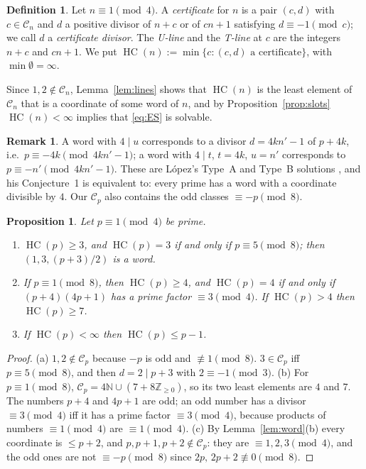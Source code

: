 \documentclass[11pt,reqno]{amsart}
\newtheorem{proposition}[theorem]{Proposition}
\theoremstyle{definition}
\newtheorem{definition}[theorem]{Definition}
\newtheorem{remark}[theorem]{Remark}
\newcommand{\Z}{\mathbb Z}
\newcommand{\N}{\mathbb N}
\newcommand{\cC}{\mathcal C}
\newcommand{\HC}{\operatorname{HC}}
\begin{document}
\begin{definition}\label{def:HC}
Let $n\equiv1\pmod4$.  A \emph{certificate} for $n$ is a pair $(c,d)$ with
$c\in\cC_n$ and $d$ a positive divisor of $n+c$ or of $cn+1$ satisfying
$d\equiv-1\pmod c$; we call $d$ a \emph{certificate divisor}.  The
\emph{U-line} and the \emph{T-line} at $c$ are the integers $n+c$ and
$cn+1$.  We put $\HC(n):=\min\{c:(c,d)\text{ a certificate}\}$, with
$\min\emptyset=\infty$.
\end{definition}

Since $1,2\notin\cC_n$, Lemma~\ref{lem:lines} shows that $\HC(n)$ is the
least element of $\cC_n$ that is a coordinate of some word of $n$, and by
Proposition~\ref{prop:slots} $\HC(n)<\infty$ implies that \eqref{eq:ES}
is solvable.

\begin{remark}\label{rem:lopez}
A word with $4\mid u$ corresponds to a divisor $d=4kn'-1$ of $p+4k$, i.e.\
$p\equiv-4k\pmod{4kn'-1}$; a word with $4\mid t$, $t=4k$, $u=n'$
corresponds to $p\equiv-n'\pmod{4kn'-1}$.  These are L\'opez's Type~A and
Type~B solutions \cite[Thms.~4 and~7]{Lopez}, and his Conjecture~1 is
equivalent to: every prime has a word with a coordinate divisible by $4$.
Our $\cC_p$ also contains the odd classes $\equiv-p\pmod 8$.
\end{remark}

\begin{proposition}\label{prop:small}
Let $p\equiv1\pmod4$ be prime.
\begin{enumerate}
\item[(a)] $\HC(p)\ge3$, and $\HC(p)=3$ if and only if $p\equiv5\pmod8$;
then $(1,3,(p+3)/2)$ is a word.
\item[(b)] If $p\equiv1\pmod8$, then $\HC(p)\ge4$, and $\HC(p)=4$ if and
only if $(p+4)(4p+1)$ has a prime factor $\equiv3\pmod4$.  If $\HC(p)>4$
then $\HC(p)\ge7$.
\item[(c)] If $\HC(p)<\infty$ then $\HC(p)\le p-1$.
\end{enumerate}
\end{proposition}

\begin{proof}
(a) $1,2\notin\cC_p$ because $-p$ is odd and $\not\equiv1\pmod 8$.  $3\in\cC_p$
iff $p\equiv5\pmod8$, and then $d=2\mid p+3$ with $2\equiv-1\pmod 3$.
(b) For $p\equiv1\pmod 8$, $\cC_p=4\N\cup(7+8\Z_{\ge0})$, so its two least
elements are $4$ and $7$.  The numbers $p+4$ and $4p+1$ are odd; an odd
number has a divisor $\equiv3\pmod4$ iff it has a prime factor
$\equiv3\pmod4$, because products of numbers $\equiv1\pmod4$ are
$\equiv1\pmod4$.  (c) By Lemma~\ref{lem:word}(b) every coordinate is
$\le p+2$, and $p,p+1,p+2\notin\cC_p$: they are $\equiv1,2,3\pmod4$, and
the odd ones are not $\equiv-p\pmod8$ since $2p,\,2p+2\not\equiv0\pmod8$.
\end{proof}
\end{document}
